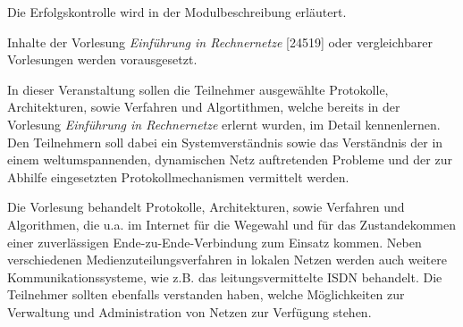 \begin{course}

\setdoclanguagegerman
{}



\coursehead


\label{cour_6141.dp_997}


\begin{styleenv}
\begin{assessment}
Die Erfolgskontrolle wird in der Modulbeschreibung erläutert.


\end{assessment}

\begin{conditions}Inhalte der Vorlesung \emph{Einführung in Rechnernetze} [24519] oder vergleichbarer Vorlesungen werden vorausgesetzt.

\end{conditions}


\end{styleenv}

\begin{learningoutcomes}
In dieser Veranstaltung sollen die Teilnehmer ausgewählte Protokolle, Architekturen, sowie Verfahren und Algortithmen, welche bereits in der Vorlesung \emph{Einführung in Rechnernetze} erlernt wurden, im Detail kennenlernen. Den Teilnehmern soll dabei ein Systemverständnis sowie das Verständnis der in einem weltumspannenden, dynamischen Netz auftretenden Probleme und der zur Abhilfe eingesetzten Protokollmechanismen vermittelt werden.


\end{learningoutcomes}

\begin{content}
Die Vorlesung behandelt Protokolle, Architekturen, sowie Verfahren und Algorithmen, die u.a. im Internet für die Wegewahl und für das Zustandekommen einer zuverlässigen Ende-zu-Ende-Verbindung zum Einsatz kommen. Neben verschiedenen Medienzuteilungsverfahren in lokalen Netzen werden auch weitere Kommunikationssysteme, wie z.B. das leitungsvermittelte ISDN behandelt. Die Teilnehmer sollten ebenfalls verstanden haben, welche Möglichkeiten zur Verwaltung und Administration von Netzen zur Verfügung stehen.



\end{content}
\end{course}
